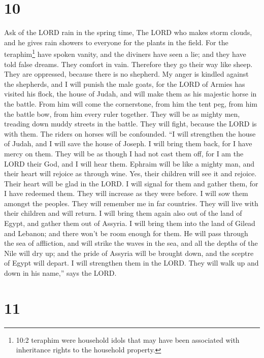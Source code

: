 \hypertarget{section-9}{%
\section{10}\label{section-9}}

 Ask of the LORD rain in the spring time, The LORD who makes
storm clouds, and he gives rain showers to everyone for the plants in
the field.  For the teraphim\footnote{10:2 teraphim were
  household idols that may have been associated with inheritance rights
  to the household property.} have spoken vanity, and the diviners have
seen a lie; and they have told false dreams. They comfort in vain.
Therefore they go their way like sheep. They are oppressed, because
there is no shepherd.  My anger is kindled against the
shepherds, and I will punish the male goats, for the LORD of Armies has
visited his flock, the house of Judah, and will make them as his
majestic horse in the battle.  From him will come the
cornerstone, from him the tent peg, from him the battle bow, from him
every ruler together.  They will be as mighty men, treading
down muddy streets in the battle. They will fight, because the LORD is
with them. The riders on horses will be confounded.  ``I
will strengthen the house of Judah, and I will save the house of Joseph.
I will bring them back, for I have mercy on them. They will be as though
I had not cast them off, for I am the LORD their God, and I will hear
them.  Ephraim will be like a mighty man, and their heart
will rejoice as through wine. Yes, their children will see it and
rejoice. Their heart will be glad in the LORD.  I will
signal for them and gather them, for I have redeemed them. They will
increase as they were before.  I will sow them amongst the
peoples. They will remember me in far countries. They will live with
their children and will return.  I will bring them again
also out of the land of Egypt, and gather them out of Assyria. I will
bring them into the land of Gilead and Lebanon; and there won't be room
enough for them.  He will pass through the sea of
affliction, and will strike the waves in the sea, and all the depths of
the Nile will dry up; and the pride of Assyria will be brought down, and
the sceptre of Egypt will depart.  I will strengthen them
in the LORD. They will walk up and down in his name,'' says the LORD.

\hypertarget{section-10}{%
\section{11}\label{section-10}}

